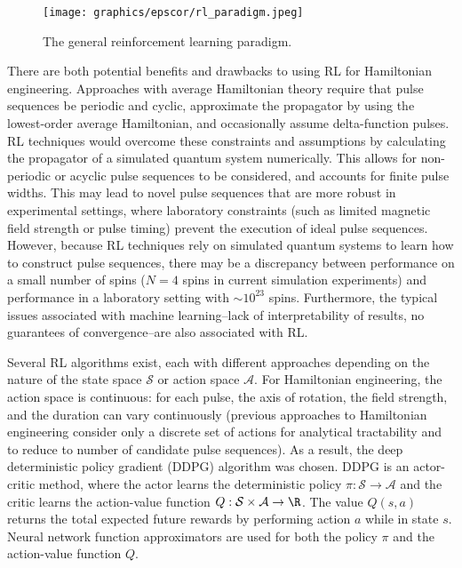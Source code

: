\documentclass{article}
\begin{document}
\begin{figure}[ht]
    \centering
    \texttt{[image: graphics/epscor/rl\_paradigm.jpeg]}
    \caption{The general reinforcement learning paradigm.}
    \label{fig:RL}
\end{figure}

There are both potential benefits and drawbacks to using RL for Hamiltonian engineering. Approaches with average Hamiltonian theory require that pulse sequences be periodic and cyclic, approximate the propagator by using the lowest-order average Hamiltonian, and occasionally assume delta-function pulses. RL techniques would overcome these constraints and assumptions by calculating the propagator of a simulated quantum system numerically. This allows for non-periodic or acyclic pulse sequences to be considered, and accounts for finite pulse widths.
This may lead to novel pulse sequences that are more robust in experimental settings, where laboratory constraints (such as limited magnetic field strength or pulse timing) prevent the execution of ideal pulse sequences.
However, because RL techniques rely on simulated quantum systems to learn how to construct pulse sequences, there may be a discrepancy between performance on a small number of spins ($N=4$ spins in current simulation experiments) and performance in a laboratory setting with $\sim10^{23}$ spins. Furthermore, the typical issues associated with machine learning--lack of interpretability of results, no guarantees of convergence--are also associated with RL.

Several RL algorithms exist, each with different approaches depending on the nature of the state space $\mathcal{S}$ or action space $\mathcal{A}$. For Hamiltonian engineering, the action space is continuous: for each pulse, the axis of rotation, the field strength, and the duration can vary continuously (previous approaches to Hamiltonian engineering consider only a discrete set of actions for analytical tractability and to reduce to number of candidate pulse sequences). As a result, the deep deterministic policy gradient (DDPG) algorithm\cite{lillicrap2015continuous} was chosen.
DDPG is an actor-critic method, where the actor learns the deterministic policy $\pi: \mathcal{S} \to \mathcal{A}$ and the critic learns the action-value function $Q: \mathcal{S} \times \mathcal{A} \to \R$. The value $Q(s,a)$ returns the total expected future rewards by performing action $a$ while in state $s$. Neural network function approximators are used for both the policy $\pi$ and the action-value function $Q$.
\end{document}
